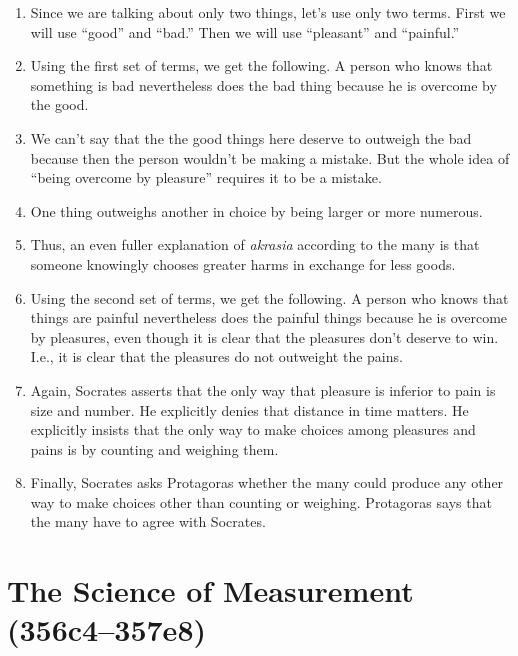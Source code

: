 \documentclass[12pt,letterpaper]{article}
\begin{document}
\begin{enumerate}
    \item Since we are talking about only two things, let's use only two terms.
        First we will use ``good'' and ``bad.''
        Then we will use ``pleasant'' and ``painful.''
    \item Using the first set of terms, we get the following.
        A person who knows that something is bad nevertheless does the bad thing because he is overcome by the good.
    \item We can't say that the the good things here deserve to outweigh the bad because then the person wouldn't be making a mistake.
        But the whole idea of ``being overcome by pleasure'' requires it to be a mistake.
    \item One thing outweighs another in choice by being larger or more numerous.
    \item Thus, an even fuller explanation of \textit{akrasia} according to the many is that someone knowingly chooses greater harms in exchange for less goods.
    \item Using the second set of terms, we get the following.
        A person who knows that things are painful nevertheless does the painful things because he is overcome by pleasures, even though it is clear that the pleasures don't deserve to win.
        I.e., it is clear that the pleasures do not outweight the pains.
    \item Again, Socrates asserts that the only way that pleasure is inferior to pain is size and number.
        He explicitly denies that distance in time matters.
        He explicitly insists that the only way to make choices among pleasures and pains is by counting and weighing them.
    \item Finally, Socrates asks Protagoras whether the many could produce any other way to make choices other than counting or weighing.
        Protagoras says that the many have to agree with Socrates.
\end{enumerate}


\section*{The Science of Measurement (356c4--357e8)}
\end{document}

